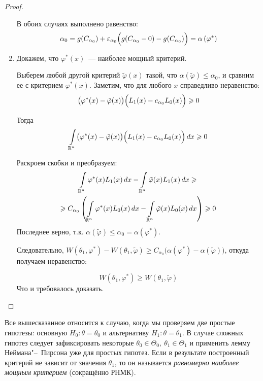 \begin{proof}
\begin{enumerate}
    В обоих случаях выполнено равенство:
    \begin{equation*}
        \alpha_{0} = 
        g(C_{\alpha_{0}}) + \varepsilon_{\alpha_{0}}\Bigl(g(C_{\alpha_{0}} - 0) - g(C_{\alpha_{0}})\Bigr) =
        \alpha\left(\varphi^{*}\right)
    \end{equation*}

    \item Докажем, что $\varphi^{*}(x)$~--- наиболее мощный критерий.

    Выберем любой другой критерий $\tilde{\varphi}(x)$ такой, что $\alpha(\tilde{\varphi}) \leqslant \alpha_{0}$, 
    и сравним ее с критерием $\varphi^{*}(x)$. 
    Заметим, что для любого $x$ справедливо неравенство:
    \begin{equation*}
        \bigl(\varphi^{*}(x)-\tilde{\varphi}(x)\bigr) \Bigl(L_{1}(x)-c_{\alpha_{0}} L_{0}(x)\Bigr) \geqslant 0
    \end{equation*}

    Тогда
    \begin{equation*}
        \int\limits_{\mathbb{R}^{n}} \bigl(\varphi^{*}(x)-\tilde{\varphi}(x)\bigr) \Bigl(L_{1}(x)-c_{\alpha_{0}} L_{0}(x)\Bigr) \, dx \geqslant 0
    \end{equation*}

    Раскроем скобки и преобразуем:
    \begin{multline*}
        \int\limits_{\mathbb{R}^{n}} \varphi^{*}(x) L_{1}(x) \, dx - \int\limits_{\mathbb{R}^{n}} \tilde{\varphi}(x) L_{1}(x) \,dx \geqslant \\
        \geqslant C_{\alpha_{0}}\left(\int\limits_{\mathbb{R}^{n}} \varphi^{*}(x) L_{0}(x) \,dx - \int\limits_{\mathbb{R}^{n}} \tilde{\varphi}(x) L_{0}(x) \,dx\right) \geqslant 0
    \end{multline*}
    Последнее верно, т.к. $\alpha(\tilde{\varphi}) \leqslant \alpha_0 = \alpha(\varphi^*)$.
    
    \smallskip
    Следовательно, $W \left(\theta_1, \varphi^{*}\right) - W(\theta_1, \tilde{\varphi}) \geqslant C_{\alpha_{0}}\bigl(\alpha\left(\varphi^{*}\right)-\alpha(\tilde{\varphi})\bigr)$, откуда получаем неравенство:

    \begin{equation*}
        W\left(\theta_1, \varphi^{*}\right) \geqslant W(\theta_1, \tilde{\varphi})
    \end{equation*}
    Что и требовалось доказать.
    \end{enumerate}
\end{proof}

\begin{rmrk}
    Все вышесказанное относится к случаю, когда мы проверяем две простые гипотезы: основную $H_0\colon \theta = \theta_0$ и альтернативу $H_1\colon \theta = \theta_1$.
    В случае сложных гипотез следует зафиксировать некоторые $\theta_0 \in \Theta_0, \: \theta_1 \in \Theta_1$ и применить лемму Неймана"--~Пирсона уже для простых гипотез.
    Если в результате построенный критерий не зависит от значения $\theta_1$, то он называется \textit{равномерно наиболее мощным критерием} (сокращённо РНМК).
\end{rmrk}
